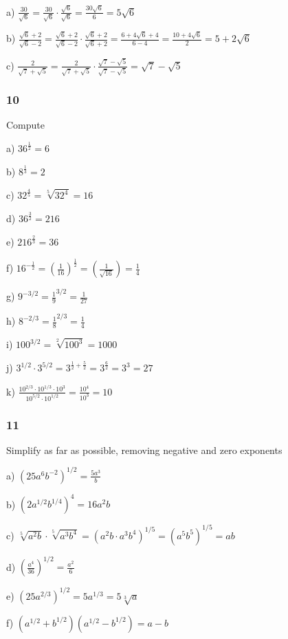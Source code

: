 \documentclass[]{report}
\begin{document}
a) $\frac{30}{\sqrt{6}} = \frac{30}{\sqrt{6}} \cdot \frac{\sqrt{6}}{\sqrt{6}} = \frac{30\sqrt{6}}{6} = 5\sqrt{6}$

b) $\frac{\sqrt{6} + 2}{\sqrt{6} - 2} = \frac{\sqrt{6} + 2}{\sqrt{6} - 2} \cdot \frac{\sqrt{6} + 2}{\sqrt{6} + 2} = \frac{6 + 4\sqrt{6} + 4}{6 - 4} = \frac{10 + 4\sqrt{6}}{2} = 5 + 2\sqrt{6}$


c) $\frac{2}{\sqrt{7} + \sqrt{5}} = \frac{2}{\sqrt{7} + \sqrt{5}} \cdot  \frac{\sqrt{7} - \sqrt{5}}{\sqrt{7} - \sqrt{5}} = \sqrt{7} - \sqrt{5}$
	
\subsubsection{10}
Compute

a) $36^{\frac{1}{2}} = 6$

b) $8^{\frac{1}{3}} = 2$

c) $32^{\frac{4}{5}} = \sqrt[5]{32^4} = 16$

d) $36^{\frac{3}{2}} = 216$	

e) $216^{\frac{2}{3}} = 36$

f) $16^{-\frac{1}{2}} = (\frac{1}{16})^{\frac{1}{2}} = (\frac{1}{\sqrt{16}}) = \frac{1}{4}$

g) $ 9^{-3/2} = \frac{1}{9}^{3/2} = \frac{1}{27}$

h) $8^{-2/3} = \frac{1}{8}^{2/3} = \frac{1}{4}$

i) $ 100^{3/2} = \sqrt[2]{100^3} = 1000$

j) $3^{1/2} \cdot 3^{5/2} = 3^{\frac{1}{2} + \frac{5}{2}} = 3^{\frac{6}{2}} = 3^3 = 27$

k) $\frac{10^{2/3} \cdot 10^{1/3} \cdot 10^3}{10^{5/2} \cdot 10^{1/2}} = \frac{10^4}{10^3} = 10$

\subsubsection{11}
Simplify as far as possible, removing negative and zero exponents

a) $(25a^6b^{-2})^{1/2} = \frac{5a^3}{b}$


b) $(2a^{1/2}b^{1/4})^4 = 16a^2b$

c) $\sqrt[5]{a^2b} \cdot \sqrt[5]{a^3b^4} = (a^2b \cdot a^3b^4)^{1/5} = (a^5b^5)^{1/5} = ab$

d) $(\frac{a^4}{36})^{1/2} = \frac{a^2}{6}$

e) $(25a^{2/3})^{1/2} = 5a^{1/3} = 5\sqrt[3]{a}$

f) $(a^{1/2} + b^{1/2})(a^{1/2} - b^{1/2}) = a - b$
\end{document}

